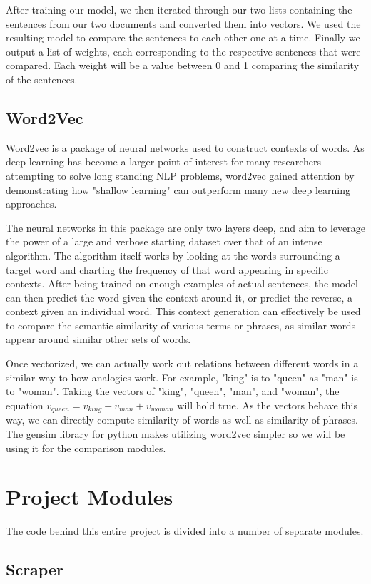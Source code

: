 \documentclass[11pt]{article}
\begin{document}
After training our model, we then iterated through our two lists containing the sentences from our two documents and converted them into vectors. We used the resulting model to compare the sentences to each other one at a time. Finally we output a list of weights, each corresponding to the respective sentences that were compared. Each weight will be a value between 0 and 1 comparing the similarity of the sentences.
\subsection{Word2Vec}
Word2vec is a package of neural networks used to construct contexts of words. As deep learning has become a larger point of interest for many researchers attempting to solve long standing NLP problems, word2vec gained attention by demonstrating how "shallow learning" can outperform many new deep learning approaches. 

The neural networks in this package are only two layers deep, and aim to leverage the power of a large and verbose starting dataset over that of an intense algorithm. The algorithm itself works by looking at the words surrounding a target word and charting the frequency of that word appearing in specific contexts. After being trained on enough examples of actual sentences, the model can then predict the word given the context around it, or predict the reverse, a context given an individual word. This context generation can effectively be used to compare the semantic similarity of various terms or phrases, as similar words appear around similar other sets of words. 

Once vectorized, we can actually work out relations between different words in a similar way to how analogies work. For example, "king" is to "queen" as "man" is to "woman". Taking the vectors of "king", "queen", "man", and "woman", the equation $v_{queen} = v_{king} - v_{man} + v_{woman}$ will hold true. As the vectors behave this way, we can directly compute similarity of words as well as similarity of phrases. The gensim library for python makes utilizing word2vec simpler so we will be using it for the comparison modules. 

\section{Project Modules}

The code behind this entire project is divided into a number of separate modules.

\subsection{Scraper}
\end{document}
